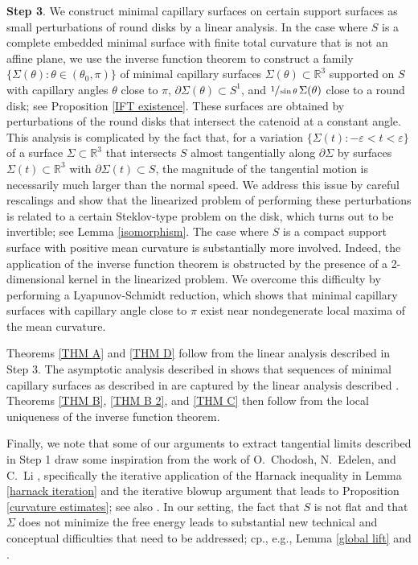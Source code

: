 \documentclass[11pt]{amsart}
\begin{document}
\textbf{Step 3}. We construct minimal capillary surfaces on certain support surfaces as small perturbations of round disks by a linear analysis. In the case where $S$ is a complete embedded minimal surface with finite total curvature that is not an affine plane, we use the inverse function theorem to construct a family $\{\Sigma(\theta):\theta\in(\theta_0,\pi)\}$ of minimal capillary surfaces $\Sigma(\theta)\subset \mathbb{R}^3$ supported on $S$ with capillary angles $\theta$  close to $\pi$, $\partial \Sigma(\theta)\subset S^1$, and $\sfrac{1}{\sin \theta}\,\Sigma(\theta)$  close to a round disk; see Proposition  \ref{IFT existence}.  These surfaces are obtained by perturbations of the round disks that intersect the catenoid at a constant angle. This analysis is complicated by the fact that, for a variation $\{\Sigma(t):-\varepsilon<t<\varepsilon\}$ of a surface $\Sigma\subset \mathbb{R}^3$ that intersects $S$ almost tangentially along $\partial \Sigma$ by surfaces $\Sigma(t)\subset \mathbb{R}^3$ with $\partial \Sigma(t)\subset S$, the magnitude of the tangential motion  is necessarily much larger than the normal speed. We address this issue by careful rescalings and show that  the linearized problem of performing these perturbations is related to a certain Steklov-type problem on the disk, which turns out to be invertible; see Lemma \ref{isomorphism}. The case where $S$ is a compact support surface with positive mean curvature is substantially more involved. Indeed, the application of the inverse function theorem  is obstructed  by the presence of a 2-dimensional kernel in the linearized problem. We overcome this difficulty by  performing a Lyapunov-Schmidt reduction, which shows that minimal capillary surfaces with capillary angle close to $\pi$ exist near nondegenerate local maxima of the mean curvature.

Theorems \ref{THM A} and \ref{THM D} follow from the linear analysis described in Step 3. The asymptotic analysis described in  shows that sequences of minimal capillary surfaces as  described in  are captured by the linear analysis described . Theorems \ref{THM B}, \ref{THM B 2}, and \ref{THM C} then follow from the local uniqueness of the inverse function theorem.  

   
Finally, we note that some of our arguments to extract tangential limits described in Step 1  draw some inspiration from the work of   O.~Chodosh, N.~Edelen, and C.~Li \cite{chodoshedelenli}, specifically the iterative application of the Harnack inequality in Lemma \ref{harnack iteration} and the iterative blowup argument that leads to Proposition \ref{curvature estimates}; see also \cite{CafarelliFriedman}. In our setting, the fact that $S$  is not flat and that $\Sigma$ does not minimize the free energy leads to substantial new technical and conceptual difficulties that need to be addressed; cp., e.g., Lemma \ref{global lift} and \cite[Lemma 4.7]{chodoshedelenli}. 
\end{document}
